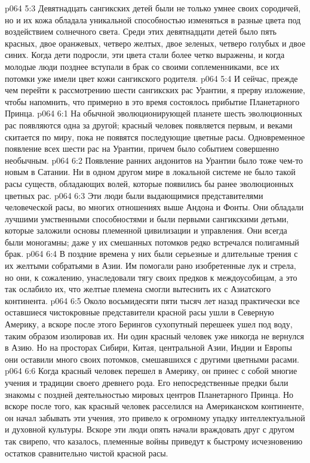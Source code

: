 \vs p064 5:3 Девятнадцать сангикских детей были не только умнее своих сородичей, но и их кожа обладала уникальной способностью изменяться в разные цвета под воздействием солнечного света. Среди этих девятнадцати детей было пять красных, двое оранжевых, четверо желтых, двое зеленых, четверо голубых и двое синих. Когда дети подросли, эти цвета стали более четко выражены, и когда молодые люди позднее вступали в брак со своими соплеменниками, все их потомки уже имели цвет кожи сангикского родителя.
\vs p064 5:4 И сейчас, прежде чем перейти к рассмотрению шести сангикских рас Урантии, я прерву изложение, чтобы напомнить, что примерно в это время состоялось прибытие Планетарного Принца.
\vs p064 6:1 На обычной эволюционирующей планете шесть эволюционных рас появляются одна за другой; красный человек появляется первым, и веками скитается по миру, пока не появятся последующие цветные расы. Одновременное появление всех шести рас на Урантии, причем  было событием совершенно необычным.
\vs p064 6:2 Появление ранних андонитов на Урантии было тоже чем\hyp{}то новым в Сатании. Ни в одном другом мире в локальной системе не было такой расы существ, обладающих волей, которые появились бы ранее эволюционных цветных рас.
\vs p064 6:3 \pc {}\bibnobreakspace {} Эти люди были выдающимися представителями человеческой расы, во многих отношениях выше Андона и Фонты. Они обладали лучшими умственными способностями и были первыми сангикскими детьми, которые заложили основы племенной цивилизации и управления. Они всегда были моногамны; даже у их смешанных потомков редко встречался полигамный брак.
\vs p064 6:4 В поздние времена у них были серьезные и длительные трения с их желтыми собратьями в Азии. Им помогали рано изобретенные лук и стрела, но они, к сожалению, унаследовали тягу своих предков к междоусобицам, а это так ослабило их, что желтые племена смогли вытеснить их с Азиатского континента.
\vs p064 6:5 Около восьмидесяти пяти тысяч лет назад практически все оставшиеся чистокровные представители красной расы ушли в Северную Америку, а вскоре после этого Берингов сухопутный перешеек ушел под воду, таким образом изолировав их. Ни один красный человек уже никогда не вернулся в Азию. Но на просторах Сибири, Китая, центральной Азии, Индии и Европы они оставили много своих потомков, смешавшихся с другими цветными расами.
\vs p064 6:6 Когда красный человек перешел в Америку, он принес с собой многие учения и традиции своего древнего рода. Его непосредственные предки были знакомы с поздней деятельностью мировых центров Планетарного Принца. Но вскоре после того, как красный человек расселился на Американском континенте, он начал забывать эти учения, это привело к огромному упадку интеллектуальной и духовной культуры. Вскоре эти люди опять начали враждовать друг с другом так свирепо, что казалось, племенные войны приведут к быстрому исчезновению остатков сравнительно чистой красной расы.
